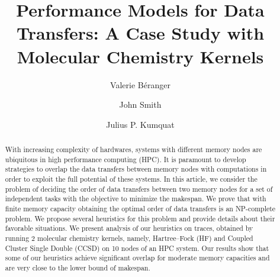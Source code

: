 \documentclass[sigconf]{acmart}
\begin{document}
	
	\title{Performance Models for Data Transfers: A Case Study with Molecular Chemistry Kernels}
	
	\author{Valerie B\'eranger}
	\author{John Smith}
	
	\author{Julius P. Kumquat}
	
	\renewcommand{\shortauthors}{Trovato and Tobin, et al.}
	
	\begin{abstract}
		With increasing complexity of hardwares, systems with different memory nodes are ubiquitous in high performance computing (HPC). It is paramount to develop strategies to overlap the data transfers between memory nodes with computations in order to exploit the full potential of these systems. In this article, we consider the problem of deciding the order of data transfers between two memory nodes for a set of independent tasks with the objective to minimize the makespan. We prove that with finite memory capacity obtaining the optimal order of data transfers is an NP-complete problem. We propose several heuristics for this problem and provide details about their favorable situations. We present analysis of our heuristics on traces, obtained by running 2 molecular chemistry kernels, namely, Hartree–Fock (HF) and Coupled Cluster Single Double (CCSD) on 10 nodes of an HPC system. Our results show that some of our heuristics achieve significant overlap for moderate memory capacities and are very close to the lower bound of makespan.
	\end{abstract}
	
	
\end{document}
